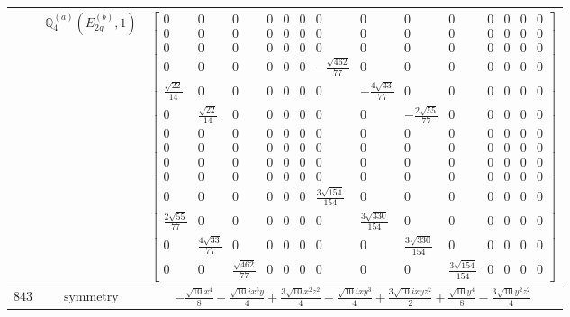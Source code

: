 \documentclass[fleqn,8pt,landscape]{jsarticle}
\begin{document}
\begin{longtable}{ccc}
$  $ & $ \mathbb{Q}_{4}^{(a)}(E_{2g}^{(b)},1) $ & $ \begin{bmatrix} 0 & 0 & 0 & 0 & 0 & 0 & 0 & 0 & 0 & 0 & 0 & 0 & 0 & 0 \\ 0 & 0 & 0 & 0 & 0 & 0 & 0 & 0 & 0 & 0 & 0 & 0 & 0 & 0 \\ 0 & 0 & 0 & 0 & 0 & 0 & 0 & 0 & 0 & 0 & 0 & 0 & 0 & 0 \\ 0 & 0 & 0 & 0 & 0 & 0 & - \frac{\sqrt{462}}{77} & 0 & 0 & 0 & 0 & 0 & 0 & 0 \\ \frac{\sqrt{22}}{14} & 0 & 0 & 0 & 0 & 0 & 0 & - \frac{4 \sqrt{33}}{77} & 0 & 0 & 0 & 0 & 0 & 0 \\ 0 & \frac{\sqrt{22}}{14} & 0 & 0 & 0 & 0 & 0 & 0 & - \frac{2 \sqrt{55}}{77} & 0 & 0 & 0 & 0 & 0 \\ 0 & 0 & 0 & 0 & 0 & 0 & 0 & 0 & 0 & 0 & 0 & 0 & 0 & 0 \\ 0 & 0 & 0 & 0 & 0 & 0 & 0 & 0 & 0 & 0 & 0 & 0 & 0 & 0 \\ 0 & 0 & 0 & 0 & 0 & 0 & 0 & 0 & 0 & 0 & 0 & 0 & 0 & 0 \\ 0 & 0 & 0 & 0 & 0 & 0 & 0 & 0 & 0 & 0 & 0 & 0 & 0 & 0 \\ 0 & 0 & 0 & 0 & 0 & 0 & \frac{3 \sqrt{154}}{154} & 0 & 0 & 0 & 0 & 0 & 0 & 0 \\ \frac{2 \sqrt{55}}{77} & 0 & 0 & 0 & 0 & 0 & 0 & \frac{3 \sqrt{330}}{154} & 0 & 0 & 0 & 0 & 0 & 0 \\ 0 & \frac{4 \sqrt{33}}{77} & 0 & 0 & 0 & 0 & 0 & 0 & \frac{3 \sqrt{330}}{154} & 0 & 0 & 0 & 0 & 0 \\ 0 & 0 & \frac{\sqrt{462}}{77} & 0 & 0 & 0 & 0 & 0 & 0 & \frac{3 \sqrt{154}}{154} & 0 & 0 & 0 & 0 \end{bmatrix} $ \\ \hline
$ 843 $ & $ \text{symmetry} $ & $ - \frac{\sqrt{10} x^{4}}{8} - \frac{\sqrt{10} i x^{3} y}{4} + \frac{3 \sqrt{10} x^{2} z^{2}}{4} - \frac{\sqrt{10} i x y^{3}}{4} + \frac{3 \sqrt{10} i x y z^{2}}{2} + \frac{\sqrt{10} y^{4}}{8} - \frac{3 \sqrt{10} y^{2} z^{2}}{4} $ \\

\end{longtable}
\end{document}

